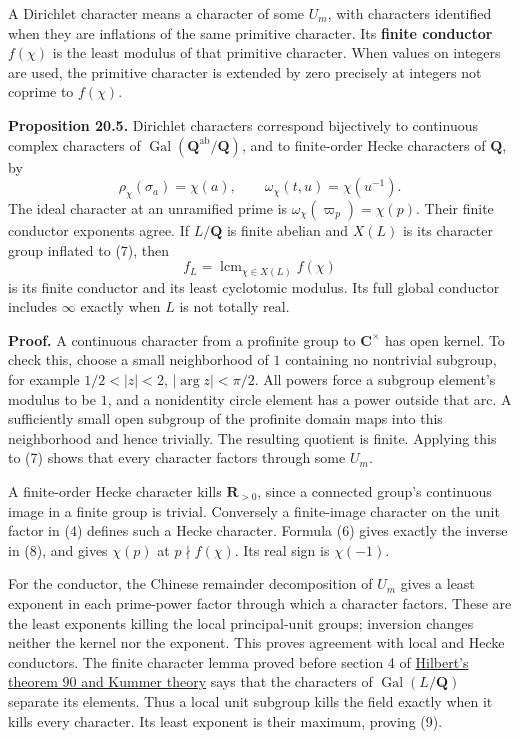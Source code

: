 \documentclass[11pt,a4paper]{article}
\begin{document}
A Dirichlet character means a character of some \(U_m\), with characters
identified when they are inflations of the same primitive character. Its
\textbf{finite conductor} \(f(\chi)\) is the least modulus of that
primitive character. When values on integers are used, the primitive
character is extended by zero precisely at integers not coprime to
\(f(\chi)\).

\textbf{Proposition 20.5.} Dirichlet characters correspond bijectively
to continuous complex characters of
\(\operatorname{Gal}(\mathbf Q^{\mathrm{ab}}/\mathbf Q)\), and to
finite-order Hecke characters of \(\mathbf Q\), by \[
\rho_\chi(\sigma_a)=\chi(a),\qquad
\omega_\chi(t,u)=\chi(u^{-1}).
\tag{8}
\] The ideal character at an unramified prime is
\(\omega_\chi(\varpi_p)=\chi(p)\). Their finite conductor exponents
agree. If \(L/\mathbf Q\) is finite abelian and \(X(L)\) is its
character group inflated to (7), then \[
f_L=\operatorname{lcm}_{\chi\in X(L)}f(\chi)
\tag{9}
\] is its finite conductor and its least cyclotomic modulus. Its full
global conductor includes \(\infty\) exactly when \(L\) is not totally
real.

\textbf{Proof.} A continuous character from a profinite group to
\(\mathbf C^\times\) has open kernel. To check this, choose a small
neighborhood of \(1\) containing no nontrivial subgroup, for example
\(1/2<|z|<2\), \(|\arg z|<\pi/2\). All powers force a subgroup element's
modulus to be \(1\), and a nonidentity circle element has a power
outside that arc. A sufficiently small open subgroup of the profinite
domain maps into this neighborhood and hence trivially. The resulting
quotient is finite. Applying this to (7) shows that every character
factors through some \(U_m\).

A finite-order Hecke character kills \(\mathbf R_{>0}\), since a
connected group's continuous image in a finite group is trivial.
Conversely a finite-image character on the unit factor in (4) defines
such a Hecke character. Formula (6) gives exactly the inverse in (8),
and gives \(\chi(p)\) at \(p\nmid f(\chi)\). Its real sign is
\(\chi(-1)\).

For the conductor, the Chinese remainder decomposition of \(U_m\) gives
a least exponent in each prime-power factor through which a character
factors. These are the least exponents killing the local principal-unit
groups; inversion changes neither the kernel nor the exponent. This
proves agreement with local and Hecke conductors. The finite character
lemma proved before section 4 of
\href{../hilberts-theorem-90-and-kummer-theory.html}{Hilbert's theorem
90 and Kummer theory} says that the characters of
\(\operatorname{Gal}(L/\mathbf Q)\) separate its elements. Thus a local
unit subgroup kills the field exactly when it kills every character. Its
least exponent is their maximum, proving (9).
\end{document}
